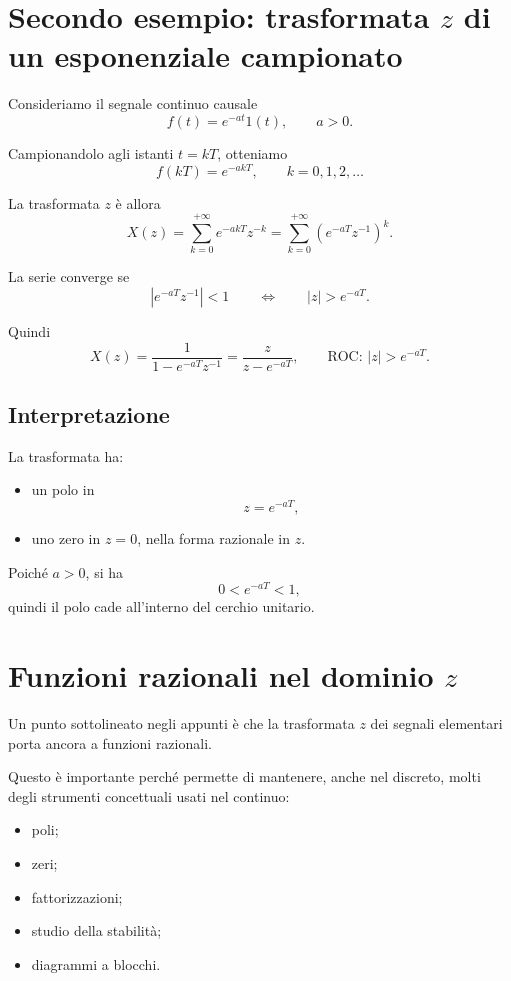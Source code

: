 \section{Secondo esempio: trasformata \(z\) di un esponenziale campionato}

Consideriamo il segnale continuo causale
\[
f(t)=e^{-at}1(t),
\qquad a>0.
\]

Campionandolo agli istanti \(t=kT\), otteniamo
\[
f(kT)=e^{-akT},
\qquad k=0,1,2,\dots
\]

La trasformata \(z\) è allora
\[
X(z)=\sum_{k=0}^{+\infty} e^{-akT}z^{-k}
=
\sum_{k=0}^{+\infty}\left(e^{-aT}z^{-1}\right)^k.
\]

La serie converge se
\[
|e^{-aT}z^{-1}|<1
\qquad\Longleftrightarrow\qquad
|z|>e^{-aT}.
\]

Quindi
\[
X(z)=\frac{1}{1-e^{-aT}z^{-1}}
=
\frac{z}{z-e^{-aT}},
\qquad
\text{ROC: } |z|>e^{-aT}.
\]

\subsection{Interpretazione}

La trasformata ha:
\begin{itemize}
    \item un polo in
    \[
    z=e^{-aT},
    \]
    \item uno zero in \(z=0\), nella forma razionale in \(z\).
\end{itemize}

Poiché \(a>0\), si ha
\[
0<e^{-aT}<1,
\]
quindi il polo cade all'interno del cerchio unitario.

\section{Funzioni razionali nel dominio \(z\)}

Un punto sottolineato negli appunti è che la trasformata \(z\) dei segnali elementari
porta ancora a funzioni razionali.

Questo è importante perché permette di mantenere, anche nel discreto,
molti degli strumenti concettuali usati nel continuo:
\begin{itemize}
    \item poli;
    \item zeri;
    \item fattorizzazioni;
    \item studio della stabilità;
    \item diagrammi a blocchi.
\end{itemize}

